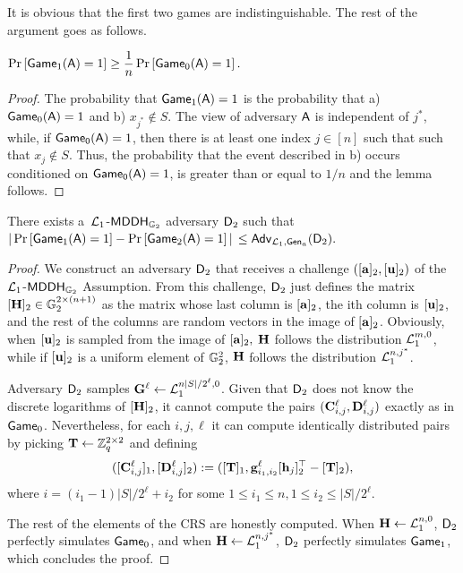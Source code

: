 It is obvious that the first two games are indistinguishable. The rest of the argument goes as follows.

\begin{lemma}
$\Pr\left[ \mathsf{Game}_1(\mathsf{A})=1\right]\geq\dfrac{1}{n}\Pr\left[\mathsf{Game}_0(\mathsf{A})=1\right].$
\end{lemma}

\begin{proof}  The probability that
 $\mathsf{Game}_1(\mathsf{A})=1$ is the probability that  a) $\mathsf{Game}_0(\mathsf{A})=1$ and
b)  $x_{j^*} \notin S$. The view of adversary $\mathsf{A}$ is independent of $j^*$, while, if $\mathsf{Game_0}(\mathsf{A})=1$, then there is at least one index $j \in [n]$ such that  
such that  $x_{j} \notin S$. Thus, 
the probability that the event described in b) occurs conditioned on $\mathsf{Game_0}(\mathsf{A})=1$, is greater than or equal to $1/n$ and the lemma follows.
\end{proof}

\begin{lemma} There exists a\ $\mathcal{L}_1$-$\mathsf{MDDH}_{\mathbb{G}_2}$ adversary $\mathsf{D}_2$ such that
$|\Pr\left[\mathsf{Game}_{1}(\advA)=1\right]\linebreak-\Pr\left[\mathsf{Game}_{2}(\advA)=1\right]|$ $\leq \mathsf{Adv}_{\mathcal{L}_1,\mathsf{Gen}_a}(\mathsf{D}_2).$
\end{lemma}
\begin{proof}
We construct an adversary $\mathsf{D}_2$ that receives 
a challenge $([\mathbf{a}]_2,[\mathbf{u}]_2)$ of the 
$\mathcal{L}_1$-$\mathsf{MDDH}_{\mathbb{G}_2}$ Assumption. From this challenge, $\mathsf{D}_2$ just defines the matrix  $[\mathbf{{H}}]_2\in\mathbb{G}_2^{2\times(n+1)}$ as the matrix whose last column is $[\mathbf{a}]_2$, the ith column is $[\mathbf{u}]_2$, and the rest of the columns are random vectors in the image of $[\mathbf{a}]_2$. 
Obviously, when $[\mathbf{u}]_2$ is sampled from 
the image of $[\mathbf{a}]_2,$ $\mathbf{{H}}$ follows the distribution $\mathcal{L}_1^{m,0}$, while if $[\mathbf{u}]_2$ is a uniform element of $\mathbb{G}^2_2$, $\mathbf{{H}}$ follows the distribution $\mathcal{L}_1^{n,j^*}$. 
 
Adversary $\mathsf{D}_2$ samples
$\mathbf{{G}}^\ell \gets \mathcal{L}_1^{n|S|/2^\ell,0}$. Given that $\mathsf{D}_2$ does not know the discrete logarithms of $[\mathbf{{H}}]_2$, it cannot compute the pairs $(\mathbf{{C}}^\ell_{i,j},\mathbf{{D}}^\ell_{i,j})$ exactly as in $\mathsf{Game}_0$. Nevertheless, for each $i,j,\ell$ it can compute identically distributed pairs by picking $\mathbf{{T}}\gets\mathbb{Z}_q^{2\times 2}$ and defining
$$
([\mathbf{{C}}^\ell_{i,j}]_1,[\mathbf{{D}}^\ell_{i,j}]_2):=([\mathbf{{T}}]_1,\mathbf{g}_{i_1,i_2}^\ell[\mathbf{h}_j]_2^\top-[\mathbf{{T}}]_2),
$$
where $i=(i_1-1)|S|/2^\ell+i_2$ for some $1\leq i_1\leq n,1\leq i_2 \leq |S|/2^\ell$.

The rest of the elements of the CRS are honestly computed. When $\mathbf{{H}}\gets\mathcal{L}_1^{n,0}$, $\mathsf{D}_2$ perfectly simulates $\mathsf{Game}_0$, and when $\mathbf{{H}}\gets\mathcal{L}_1^{n,j^*}$, $\mathsf{D}_2$ perfectly simulates $\mathsf{Game}_1$, which concludes the proof. 
\end{proof}

